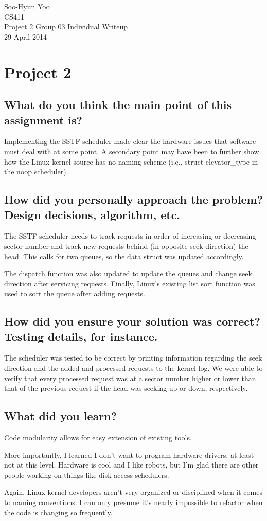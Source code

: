 \documentclass[11pt,letterpaper]{article}
\begin{document}
Soo-Hyun Yoo \\
CS411 \\
Project 2 Group 03 Individual Writeup \\
29 April 2014


\section*{Project 2}

\subsection*{What do you think the main point of this assignment is?}

Implementing the SSTF scheduler made clear the hardware issues that software
must deal with at some point. A secondary point may have been to further show
how the Linux kernel source has no naming scheme (i.e., struct elevator\_type
in the noop scheduler).


\subsection*{How did you personally approach the problem? Design decisions,
algorithm, etc.}

The SSTF scheduler needs to track requests in order of increasing or decreasing
sector number and track new requests behind (in opposite seek direction) the
head. This calls for two queues, so the data struct was updated accordingly.

The dispatch function was also updated to update the queues and change seek
direction after servicing requests. Finally, Linux's existing list sort
function was used to sort the queue after adding requests.


\subsection*{How did you ensure your solution was correct? Testing details, for
instance.}

The scheduler was tested to be correct by printing information regarding the
seek direction and the added and processed requests to the kernel log. We were
able to verify that every processed request was at a sector number higher or
lower than that of the previous request if the head was seeking up or down,
respectively.


\subsection*{What did you learn?}

Code modularity allows for easy extension of existing tools.

More importantly, I learned I don't want to program hardware drivers, at least
not at this level. Hardware is cool and I like robots, but I'm glad there are
other people working on things like disk access schedulers.

Again, Linux kernel developers aren't very organized or disciplined when it
comes to naming conventions. I can only presume it's nearly impossible to
refactor when the code is changing so frequently.
\end{document}
